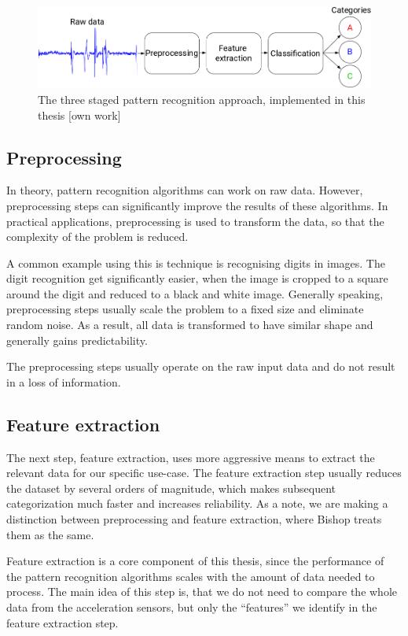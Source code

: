 \begin{figure}
    \centering
    \includegraphics[width=\textwidth]{figures/PatternRecognitionSteps.png}
    \caption{The three staged pattern recognition approach, implemented in this thesis [own work]}
    \label{fig:patternrecognitionsteps}
\end{figure}

\subsection{Preprocessing}
In theory, pattern recognition algorithms can work on raw data. However, preprocessing steps can significantly improve the results of these algorithms. In practical applications, preprocessing is used to transform the data, so that the complexity of the problem is reduced. 

A common example using this is technique is recognising digits in images. The digit recognition get significantly easier, when the image is cropped to a square around the digit and reduced to a black and white image. Generally speaking, preprocessing steps usually scale the problem to a fixed size and eliminate random noise. As a result, all data is transformed to have similar shape and generally gains predictability.

The preprocessing steps usually operate on the raw input data and do not result in a loss of information.

\subsection{Feature extraction}
The next step, feature extraction, uses more aggressive means to extract the relevant data for our specific use-case. The feature extraction step usually reduces the dataset by several orders of magnitude, which makes subsequent categorization much faster and increases reliability. As a note, we are making a distinction between preprocessing and feature extraction, where Bishop \cite{bishop2006pattern} treats them as the same.

Feature extraction is a core component of this thesis, since the performance of the pattern recognition algorithms scales with the amount of data needed to process. The main idea of this step is, that we do not need to compare the whole data from the acceleration sensors, but only the ``features'' we identify in the feature extraction step.


